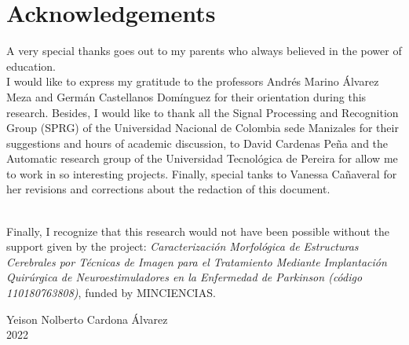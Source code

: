 \cleardoublepage
\chapter*{Acknowledgements}

A very special thanks goes out to my parents who always believed in the power of education.\\

I would like to express my gratitude to the professors Andrés Marino Álvarez Meza and Germán Castellanos Domínguez for their orientation during this research. Besides, I would like to thank all the Signal Processing and Recognition Group (SPRG) of the Universidad Nacional de Colombia sede Manizales for their suggestions and hours of academic discussion, to David Cardenas Peña and the Automatic research group of the Universidad Tecnológica de Pereira for allow me to work in so interesting projects. Finally, special tanks to Vanessa Cañaveral for her revisions and corrections about the redaction of this document.

\\

Finally, I recognize that this research would not have been possible without the support given by the project: \textit{Caracterización Morfológica de Estructuras Cerebrales por Técnicas de Imagen para el Tratamiento Mediante Implantación Quirúrgica de Neuroestimuladores en la Enfermedad de Parkinson  (código 110180763808)}, funded by MINCIENCIAS.

\begin{flushright}
Yeison Nolberto Cardona Álvarez\\
2022
\end{flushright}